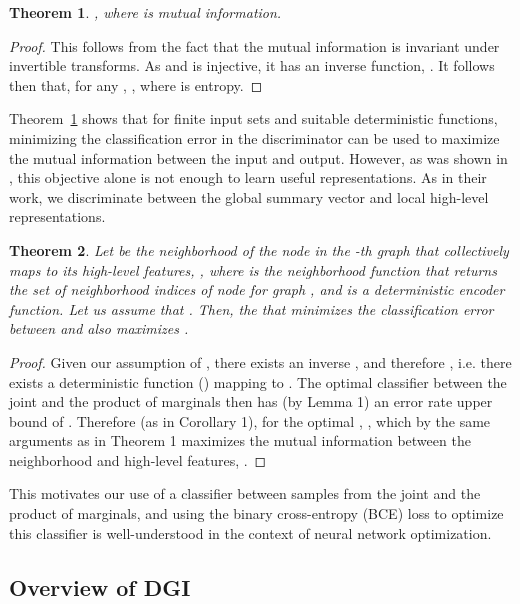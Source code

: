 \documentclass{article} \usepackage{iclr2019_conference,times}
\newtheorem{theo}{Theorem}
\begin{document}
\begin{theo}
, where  is mutual information.
\label{theorem}
\end{theo}
\begin{proof}
This follows from the fact that the mutual information is invariant under invertible transforms.
As  and  is injective, it has an inverse function, .
It follows then that, for any , , where  is entropy.
\end{proof}

Theorem~\ref{theorem} shows that for finite input sets and suitable deterministic functions, minimizing the classification error in the discriminator can be used to maximize the mutual information between the input and output.
However, as was shown in \citet{hjelm2018learning}, this objective alone is not enough to learn useful representations.
As in their work, we discriminate between the global summary vector and local high-level representations.

\begin{theo}
Let  be the neighborhood of the node  in the -th graph that collectively maps to its high-level features, , where  is the neighborhood function that returns the set of neighborhood indices of node  for graph , and  is a deterministic encoder function.
Let us assume that .
Then, the  that minimizes the classification error between  and  also maximizes .
\end{theo}
\begin{proof}
Given our assumption of , there exists an inverse , and therefore , i.e. there exists a deterministic function () mapping  to .
The optimal classifier between the joint  and the product of marginals  then has (by Lemma 1) an error rate upper bound of .
Therefore (as in Corollary 1), for the optimal , , which by the same arguments as in Theorem 1 maximizes the mutual information between the neighborhood and high-level features, .
\end{proof}

This motivates our use of a classifier between samples from the joint and the product of marginals, and using the binary cross-entropy (BCE) loss to optimize this classifier is well-understood in the context of neural network optimization.

\subsection{Overview of DGI}\label{sec:algo}
\end{document}
